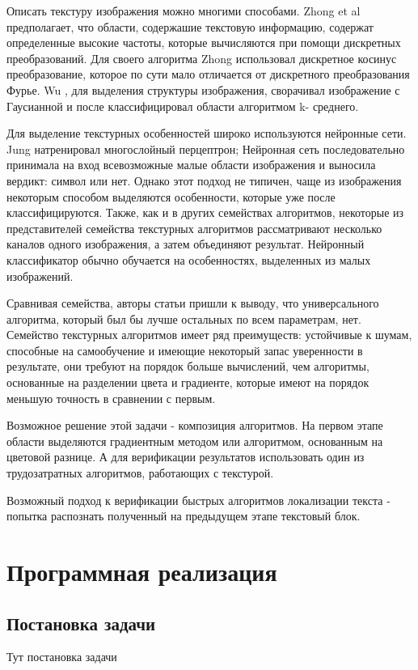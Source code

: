 \documentclass[oneside,final,14pt]{extreport}
\begin{document}
Описать текстуру изображения можно многими способами. Zhong et al \cite{Zhong:loc_text0} \cite{Zhong:loc_text1} предполагает, что области, содержашие текстовую информацию, содержат определенные высокие частоты, которые вычисляются при помощи дискретных преобразований. Для  своего алгоритма Zhong использовал дискретное косинус преобразование, которое по сути мало отличается от дискретного преобразования Фурье.  Wu \cite{Wu:text_loc0} \cite{Wu:text_loc1}, для выделения структуры изображения, сворачивал изображение с Гаусианной и после классифицировал области алгоритмом k- среднего.

Для выделение текстурных особенностей широко используются нейронные сети. Jung \cite{Jung:text_loc}  натренировал многослойный перцептрон; Нейронная сеть последовательно принимала на вход всевозможные малые области изображения и выносила вердикт: символ или нет. Однако этот подход не типичен, чаще из изображения некоторым способом выделяются особенности, которые уже после классифицируются.  Также, как и в других семействах алгоритмов, некоторые из представителей семейства текстурных алгоритмов рассматривают несколько каналов одного изображения, а затем объединяют результат. Нейронный классификатор обычно обучается на особенностях, выделенных из малых изображений.  

Сравнивая семейства, авторы статьи \cite{JDAR_survey} пришли к выводу, что универсального алгоритма, который был бы лучше остальных по всем параметрам, нет.  Семейство текстурных алгоритмов имеет ряд преимуществ: устойчивые к шумам, способные на самообучение и имеющие некоторый запас уверенности в результате, они требуют на порядок больше вычислений, чем алгоритмы, основанные на разделении цвета и градиенте, которые имеют на порядок меньшую точность в сравнении с первым. 

Возможное решение этой задачи - композиция алгоритмов. На первом этапе области выделяются градиентным методом или алгоритмом, основанным на цветовой разнице. А для верификации результатов использовать один из трудозатратных алгоритмов, работающих с текстурой.   

Возможный подход к верификации быстрых алгоритмов локализации текста - попытка распознать полученный на предыдущем этапе текстовый блок.

\chapter{Программная реализация}
\section{Постановка задачи}
Тут постановка задачи
\end{document}
